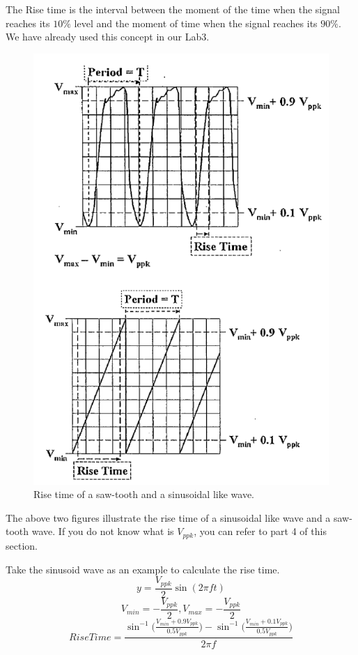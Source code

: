 \documentclass{article}
\begin{document}
The Rise time is the interval between the moment of the time when the signal reaches its $10\%$ level and the moment of time when the signal reaches its $90\%$. We have already used this concept in our Lab3.

\begin{figure}[H]\centering
    \includegraphics[scale=1.0]{rise.png}
    \caption{Rise time of a saw-tooth and a sinusoidal like wave.}
\end{figure}

The above two figures illustrate the rise time of a sinusoidal like wave and a saw-tooth wave. If you do not know what is $V_{ppk}$, you can refer to part 4 of this section.

Take the sinusoid wave as an example to calculate the rise time.
$$y = \frac{V_{ppk}}{2}\sin(2\pi ft)$$
$$V_{min} = -\frac{V_{ppk}}{2}, V_{max} = -\frac{V_{ppk}}{2}$$
$$RiseTime = \frac{\sin^{-1}\big(\frac{V_{min}+0.9V_{ppk}}{0.5V_{ppk}}\big)-\sin^{-1}\big(\frac{V_{min}+0.1V_{ppk}}{0.5V_{ppk}}\big)}{2\pi f}$$
\end{document}
